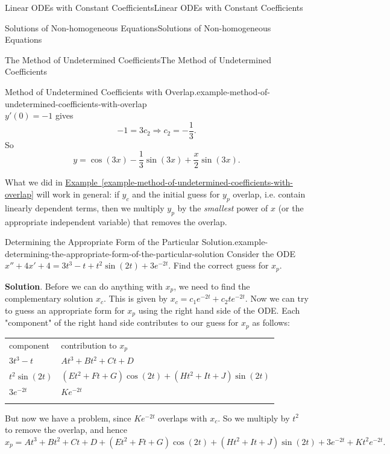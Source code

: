 \documentclass[10pt,]{book}
\numberwithin{equation}{section}
\newcommand{\hrulethick} {\noalign{\hrule height 0.11em}}
\begin{document}
\begin{chapterptx}{Linear ODEs with Constant Coefficients}{}{Linear ODEs with Constant Coefficients}{}{}
\begin{sectionptx}{Solutions of Non-homogeneous Equations}{}{Solutions of Non-homogeneous Equations}{}{}
\begin{subsectionptx}{The Method of Undetermined Coefficients}{}{The Method of Undetermined Coefficients}{}{}
\begin{example}{Method of Undetermined Coefficients with Overlap.}{example-method-of-undetermined-coefficients-with-overlap}
\begin{equation*}
\end{equation*}
\(y'(0)=-1\) gives%
\begin{equation*}
-1 = 3c_{2}\Rightarrow c_{2} = -\frac{1}{3}.
\end{equation*}
So%
\begin{equation*}
y = \cos(3x)-\frac{1}{3}\sin(3x)+\frac{x}{2}\sin(3x).
\end{equation*}
%
\end{example}
\hypertarget{p-242}{}%
What we did in \hyperref[example-method-of-undetermined-coefficients-with-overlap]{Example~\ref{example-method-of-undetermined-coefficients-with-overlap}} will work in general: if \(y_{c}\) and the initial guess for \(y_{p}\) overlap, i.e. contain linearly dependent terms, then we multiply \(y_{p}\) by the \emph{smallest} power of \(x\) (or the appropriate independent variable) that removes the overlap.%
\begin{example}{Determining the Appropriate Form of the Particular Solution.}{example-determining-the-appropriate-form-of-the-particular-solution}%
\hypertarget{p-243}{}%
Consider the ODE \(x'' + 4x' + 4 = 3t^{3} - t + t^{2}\sin(2t) + 3e^{-2t}.\) Find the correct guess for \(x_{p}\).%
\par\smallskip%
\noindent\textbf{Solution}.\hypertarget{solution-35}{}\quad%
\hypertarget{p-244}{}%
Before we can do anything with \(x_{p}\), we need to find the complementary solution \(x_{c}\). This is given by \(x_{c} = c_{1}e^{-2t} + c_{2}te^{-2t}.\) Now we can try to guess an appropriate form for \(x_{p}\) using the right hand side of the ODE. Each "component" of the right hand side contributes to our guess for \(x_{p}\) as follows: \begin{table}
\centering
\begin{tabular}{ll}\hrulethick
component&contribution to \(x_{p}\)\tabularnewline\hrulethick
\(3t^{3} - t\)&\(At^{3} + Bt^{2} + Ct + D\)\tabularnewline\hrulethick
\(t^{2}\sin(2t)\)&\((Et^{2} + Ft + G)\cos(2t) + (Ht^{2} + It + J)\sin(2t)\)\tabularnewline\hrulethick
\(3e^{-2t}\)&\(Ke^{-2t}\)\tabularnewline\hrulethick
\end{tabular}
\end{table}
 But now we have a problem, since \(Ke^{-2t}\) overlaps with \(x_{c}\). So we multiply by \(t^{2}\) to remove the overlap, and hence \(x_{p} = At^{3} + Bt^{2} + Ct + D + (Et^{2} + Ft + G)\cos(2t) + (Ht^{2} + It + J)\sin(2t) + 3e^{-2t} + Kt^{2}e^{-2t}.\)%
\end{example}
\end{subsectionptx}
\begin{conclusion}{}%

\end{conclusion}
\end{sectionptx}
\end{chapterptx}
\end{document}
